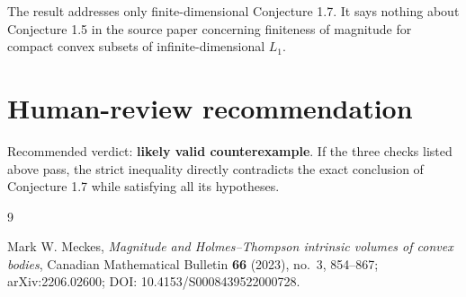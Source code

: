 \documentclass[11pt]{article}
\begin{document}
The result addresses only finite-dimensional Conjecture 1.7. It says nothing
about Conjecture 1.5 in the source paper concerning finiteness of magnitude for
compact convex subsets of infinite-dimensional \(L_1\).

\section{Human-review recommendation}

Recommended verdict: \textbf{likely valid counterexample}. If the three
checks listed above pass, the strict inequality directly contradicts the
exact conclusion of Conjecture 1.7 while satisfying all its hypotheses.

\begin{thebibliography}{9}

Mark W. Meckes,
\emph{Magnitude and Holmes--Thompson intrinsic volumes of convex bodies},
Canadian Mathematical Bulletin \textbf{66} (2023), no.~3, 854--867;
arXiv:2206.02600; DOI: 10.4153/S0008439522000728.

\end{thebibliography}
\end{document}
